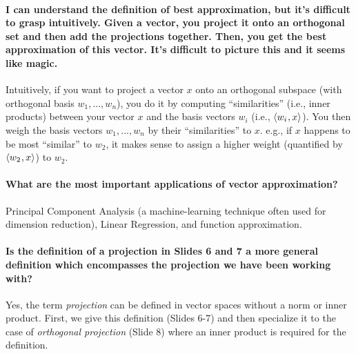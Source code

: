 \documentclass[10pt,english]{article}
\begin{document}
\paragraph{I can understand the definition of best approximation, but it's difficult to grasp intuitively. Given a vector, you project it onto an orthogonal set and then add the projections together.  Then, you get the best approximation of this vector. It's difficult to picture this and it seems like magic. }
Intuitively, if you want to project a vector $x$ onto an orthogonal subspace (with orthogonal basis $w_1,...,w_n$), you do it by computing ``similarities'' (i.e., inner products) between your vector $x$ and the basis vectors $w_i$ (i.e., ${\langle  w_i \mskip1mu , x  \rangle}$). You then weigh the basis vectors $w_1,...,w_n$ by their ``similarities'' to $x$. e.g., if $x$ happens to be most ``similar'' to $w_2$, it makes sense to assign a higher weight (quantified by ${\langle  w_2 \mskip1mu , x  \rangle}$) to $w_2$.

\paragraph{What are the most important applications of vector approximation?}
Principal Component Analysis (a machine-learning technique often used for dimension reduction), Linear Regression, and function approximation.

\paragraph{Is the definition of a projection in Slides 6 and 7 a more general definition which encompasses the projection we have been working with?}
Yes, the term \emph{projection} can be defined in vector spaces without a norm or inner product.
First, we give this definition (Slides 6-7) and then specialize it to the case of \emph{orthogonal projection} (Slide 8) where an inner product is required for the definition.
\end{document}
